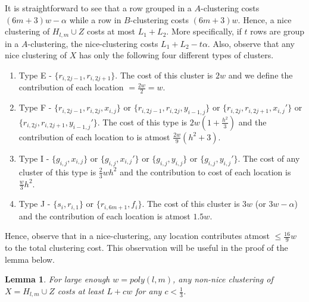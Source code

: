 \documentclass{article}
\newtheorem{lemma}[theorem]{Lemma}
\begin{document}
It is straightforward to see that a row grouped in a $A$-clustering costs $(6m+3)w-\alpha$ while a row in $B$-clustering costs $(6m+3)w$. Hence, a nice clustering of $H_{l,m} \cup Z$ costs at most $L_1 + L_2$. More specifically, if $t$ rows are group in a $A$-clustering, the nice-clustering costs $L_1+L_2-t\alpha$. Also, observe that any nice clustering of $X$ has only the following four different types of clusters. \begin{enumerate}[label=(\arabic*),nolistsep,leftmargin=*]
\item Type E - $\{r_{i,2j-1}, r_{i,2j+1}\}$. The cost of this cluster is $2w$ and we define the contribution of each location $ = \frac{2w}{2} = w$.
\item Type F - $\{r_{i,2j-1}, r_{i, 2j}, x_{i, j}\}$ or $\{r_{i,2j-1}, r_{i, 2j}, y_{i-1, j}\}$ or $\{r_{i,2j}, r_{i, 2j+1}, x_{i, j}'\}$ or $\{r_{i,2j}, r_{i, 2j+1}, y_{i-1, j}'\}$. The cost of this type is $2w(1+\frac{h^2}{3})$ and the contribution of each location to is atmost $\frac{2w}{9}(h^2+3)$.
\item Type I - $\{g_{i, j}, x_{i,j}\}$ or $\{g_{i, j}, x_{i,j}'\}$  or $\{g_{i, j}, y_{i,j}\}$  or $\{g_{i, j}, y_{i,j}'\}$. The cost of any cluster of this type is $\frac{2}{3}wh^2$ and the contribution to cost of each location is $\frac{w}{3}h^2$.
\item Type J - $\{s_i, r_{i,1}\}$ or $\{r_{i,6m+1}, f_i\}$. The cost of this cluster is $3w$ (or $3w-\alpha$) and the contribution of each location is atmost $1.5w$. 
\end{enumerate}
Hence, observe that in a nice-clustering, any location contributes atmost $\le \frac{16}{9}w$ to the total clustering cost. This observation will be useful in the proof of the lemma below.

\begin{lemma}
For large enough $w = poly(l, m)$, any non-nice clustering of $X = H_{l, m} \cup Z$ costs at least $L + cw$ for any $c < \frac{1}{3}$.
\end{lemma}
\end{document}
